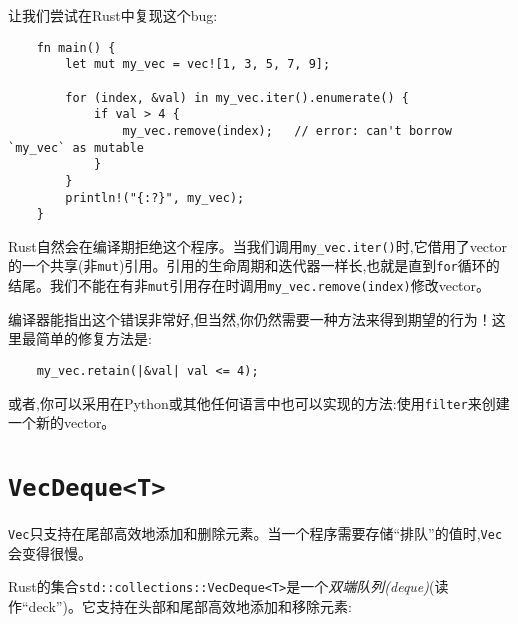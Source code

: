 让我们尝试在Rust中复现这个bug:
\begin{verbatim}
    fn main() {
        let mut my_vec = vec![1, 3, 5, 7, 9];
        
        for (index, &val) in my_vec.iter().enumerate() {
            if val > 4 {
                my_vec.remove(index);   // error: can't borrow `my_vec` as mutable
            }
        }
        println!("{:?}", my_vec);
    }
\end{verbatim}

Rust自然会在编译期拒绝这个程序。当我们调用\texttt{my\_vec.iter()}时,它借用了vector的一个共享(非\texttt{mut})引用。引用的生命周期和迭代器一样长,也就是直到\texttt{for}循环的结尾。我们不能在有非\texttt{mut}引用存在时调用\texttt{my\_vec.remove(index)}修改vector。

编译器能指出这个错误非常好,但当然,你仍然需要一种方法来得到期望的行为！这里最简单的修复方法是:
\begin{verbatim}
    my_vec.retain(|&val| val <= 4);
\end{verbatim}

或者,你可以采用在Python或其他任何语言中也可以实现的方法:使用\texttt{filter}来创建一个新的vector。

\section{\texttt{VecDeque<T>}}

\texttt{Vec}只支持在尾部高效地添加和删除元素。当一个程序需要存储“排队”的值时,\texttt{Vec}会变得很慢。

Rust的集合\texttt{std::collections::VecDeque<T>}是一个\emph{双端队列(deque)}(读作“deck”)。它支持在头部和尾部高效地添加和移除元素:






